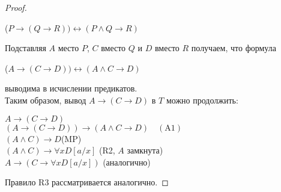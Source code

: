 \begin{proof}
\begin{center}
    ($P \rightarrow(Q\rightarrow R))\leftrightarrow (P\wedge Q\rightarrow R)$
\end{center}
Подставляя $A$ место $P$, $C$ вместо $Q$ и $D$ вместо $R$ получаем, что формула
\begin{center}
     ($A \rightarrow(C\rightarrow D))\leftrightarrow (A\wedge C\rightarrow D)$
\end{center}
выводима в исчислении предикатов.\\
Таким образом, вывод $A \rightarrow(C\rightarrow D)$ в $T$ можно продолжить:
\begin{center}
    $A \rightarrow(C \rightarrow D)$\\
$(A \rightarrow(C \rightarrow D)) \rightarrow(A \wedge C \rightarrow D) \quad(\mathrm{A} 1)$\\
$(A \wedge C) \rightarrow D$(MP)\\
$(A \wedge C) \rightarrow \forall x D[a / x]$ (R2, $A$ замкнута)\\ $A \rightarrow(C \rightarrow \forall x D[a / x])$ (аналогично)
\end{center}
Правило R3 рассматривается аналогично.
\end{proof}